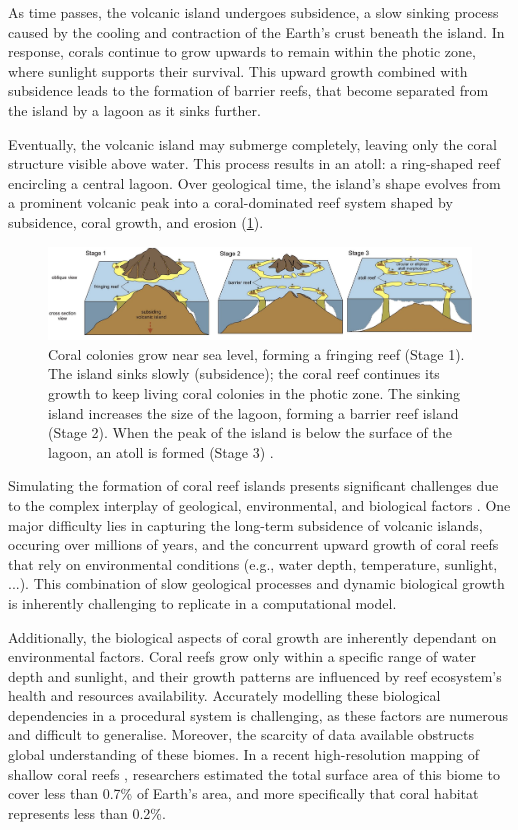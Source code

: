 As time passes, the volcanic island undergoes subsidence, a slow sinking process caused by the cooling and contraction of the Earth's crust beneath the island. In response, corals continue to grow upwards to remain within the photic zone, where sunlight supports their survival. This upward growth combined with subsidence leads to the formation of barrier reefs, that become separated from the island by a lagoon as it sinks further.

Eventually, the volcanic island may submerge completely, leaving only the coral structure visible above water. This process results in an atoll: a ring-shaped reef encircling a central lagoon. Over geological time, the island's shape evolves from a prominent volcanic peak into a coral-dominated reef system shaped by subsidence, coral growth, and erosion (\cref{fig:coral-island-reef-growth}).

\begin{figure}[H]
    \includegraphics[width = \linewidth]{other_images/Drawings/Darwin_corals-color-Terry2012.jpg}
    \caption[Darwin's subsidence theory]{Coral colonies grow near sea level, forming a fringing reef (Stage 1). The island sinks slowly (subsidence); the coral reef continues its growth to keep living coral colonies in the photic zone. The sinking island increases the size of the lagoon, forming a barrier reef island (Stage 2). When the peak of the island is below the surface of the lagoon, an atoll is formed (Stage 3) \cite{Terry2013}.}
    \label{fig:coral-island-reef-growth}
\end{figure}

Simulating the formation of coral reef islands presents significant challenges due to the complex interplay of geological, environmental, and biological factors \cite{Hopley2014}. One major difficulty lies in capturing the long-term subsidence of volcanic islands, occuring over millions of years, and the concurrent upward growth of coral reefs that rely on environmental conditions (e.g., water depth, temperature, sunlight, ...). This combination of slow geological processes and dynamic biological growth is inherently challenging to replicate in a computational model.

Additionally, the biological aspects of coral growth are inherently dependant on environmental factors. Coral reefs grow only within a specific range of water depth and sunlight, and their growth patterns are influenced by reef ecosystem's health and resources availability. Accurately modelling these biological dependencies in a procedural system is challenging, as these factors are numerous and difficult to generalise. Moreover, the scarcity of data available obstructs global understanding of these biomes. In a recent high-resolution mapping of shallow coral reefs \cite{Lyons2024}, researchers estimated the total surface area of this biome to cover less than 0.7\% of Earth's area, and more specifically that coral habitat represents less than 0.2\%.

